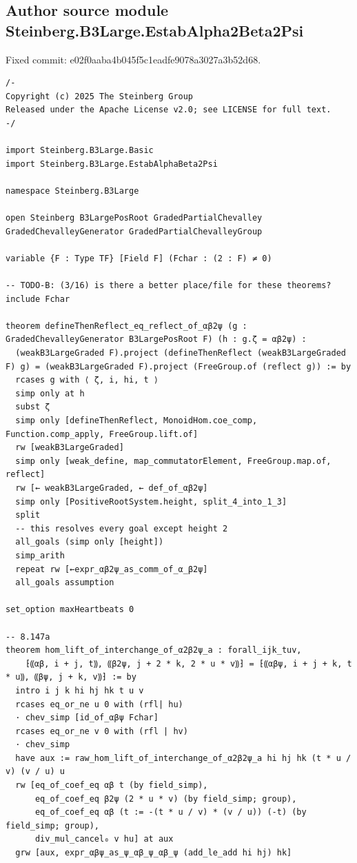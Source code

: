 \documentclass[10pt,a4paper]{article}
\begin{document}
\subsection*{Author source module Steinberg.B3Large.EstabAlpha2Beta2Psi}
\noindent Fixed commit: e02f0aaba4b045f5c1eadfe9078a3027a3b52d68.
\begin{Verbatim}
/-
Copyright (c) 2025 The Steinberg Group
Released under the Apache License v2.0; see LICENSE for full text.
-/

import Steinberg.B3Large.Basic
import Steinberg.B3Large.EstabAlphaBeta2Psi

namespace Steinberg.B3Large

open Steinberg B3LargePosRoot GradedPartialChevalley GradedChevalleyGenerator GradedPartialChevalleyGroup

variable {F : Type TF} [Field F] (Fchar : (2 : F) ≠ 0)

-- TODO-B: (3/16) is there a better place/file for these theorems?
include Fchar

theorem defineThenReflect_eq_reflect_of_αβ2ψ (g : GradedChevalleyGenerator B3LargePosRoot F) (h : g.ζ = αβ2ψ) :
  (weakB3LargeGraded F).project (defineThenReflect (weakB3LargeGraded F) g) = (weakB3LargeGraded F).project (FreeGroup.of (reflect g)) := by
  rcases g with ⟨ ζ, i, hi, t ⟩
  simp only at h
  subst ζ
  simp only [defineThenReflect, MonoidHom.coe_comp, Function.comp_apply, FreeGroup.lift.of]
  rw [weakB3LargeGraded]
  simp only [weak_define, map_commutatorElement, FreeGroup.map.of, reflect]
  rw [← weakB3LargeGraded, ← def_of_αβ2ψ]
  simp only [PositiveRootSystem.height, split_4_into_1_3]
  split
  -- this resolves every goal except height 2
  all_goals (simp only [height])
  simp_arith
  repeat rw [←expr_αβ2ψ_as_comm_of_α_β2ψ]
  all_goals assumption

set_option maxHeartbeats 0

-- 8.147a
theorem hom_lift_of_interchange_of_α2β2ψ_a : forall_ijk_tuv,
    ⁅⸨αβ, i + j, t⸩, ⸨β2ψ, j + 2 * k, 2 * u * v⸩⁆ = ⁅⸨αβψ, i + j + k, t * u⸩, ⸨βψ, j + k, v⸩⁆ := by
  intro i j k hi hj hk t u v
  rcases eq_or_ne u 0 with (rfl| hu)
  · chev_simp [id_of_αβψ Fchar]
  rcases eq_or_ne v 0 with (rfl | hv)
  · chev_simp
  have aux := raw_hom_lift_of_interchange_of_α2β2ψ_a hi hj hk (t * u / v) (v / u) u
  rw [eq_of_coef_eq αβ t (by field_simp),
      eq_of_coef_eq β2ψ (2 * u * v) (by field_simp; group),
      eq_of_coef_eq αβ (t := -(t * u / v) * (v / u)) (-t) (by field_simp; group),
      div_mul_cancel₀ v hu] at aux
  grw [aux, expr_αβψ_as_ψ_αβ_ψ_αβ_ψ (add_le_add hi hj) hk]


\end{Verbatim}
\end{document}
